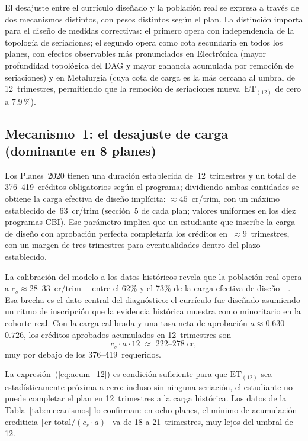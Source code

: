 \documentclass[11pt,letterpaper]{article}
\newcommand{\ET}[1]{\mathrm{ET}_{(#1)}}
\begin{document}
El desajuste entre el currículo diseñado y la población real se expresa a través
de dos mecanismos distintos, con pesos distintos según el plan.
La distinción importa para el diseño de medidas correctivas: el primero opera
con independencia de la topología de seriaciones; el segundo opera como cota
secundaria en todos los planes, con efectos observables más pronunciados en
Electrónica (mayor profundidad topológica del DAG y mayor ganancia acumulada
por remoción de seriaciones) y en Metalurgia (cuya cota de carga es la más
cercana al umbral de 12~trimestres, permitiendo que la remoción de seriaciones
mueva~$\ET{12}$ de cero a $7.9\,\text{\%}$).

\subsection{Mecanismo~1: el desajuste de carga (dominante en 8 planes)}

Los Planes~2020 tienen una duración establecida de~12~trimestres y un total de
376--419~créditos obligatorios según el programa; dividiendo ambas cantidades se
obtiene la carga efectiva de diseño implícita: $\approx 45$~cr/trim, con un máximo
establecido de~63~cr/trim (sección~5 de cada plan; valores uniformes en los
diez programas CBI).
Ese parámetro implica que un estudiante que inscribe la carga de diseño con
aprobación perfecta completaría los créditos en~$\approx 9$~trimestres, con un
margen de tres trimestres para eventualidades dentro del plazo establecido.

La calibración del modelo a los datos históricos revela que la población real
opera a $c_s\approx 28$--$33$~cr/trim ---entre el 62\% y el 73\% de la
carga efectiva de diseño---.
Esa brecha es el dato central del diagnóstico: el currículo fue diseñado
asumiendo un ritmo de inscripción que la evidencia histórica muestra como
minoritario en la cohorte real.
Con la carga calibrada y una tasa neta de aprobación $\bar{a}\approx 0.630$--$0.726$,
los créditos aprobados acumulados en 12~trimestres son
\begin{equation}
  c_s\cdot\bar{a}\cdot 12 \;\approx\; 222\text{--}278\;\text{cr},
  \label{eq:acum_12}
\end{equation}
muy por debajo de los 376--419~requeridos.

La expresión~(\ref{eq:acum_12}) es condición suficiente para que $\ET{12}$
sea estadísticamente próxima a cero: incluso sin ninguna seriación, el
estudiante no puede completar el plan en 12~trimestres a la carga histórica.
Los datos de la Tabla~\ref{tab:mecanismos} lo confirman: en ocho planes, el
mínimo de acumulación crediticia
$\lceil\mathrm{cr\_total}/(c_s\cdot\bar{a})\rceil$ va de 18 a 21~trimestres,
muy lejos del umbral de 12.
\end{document}
